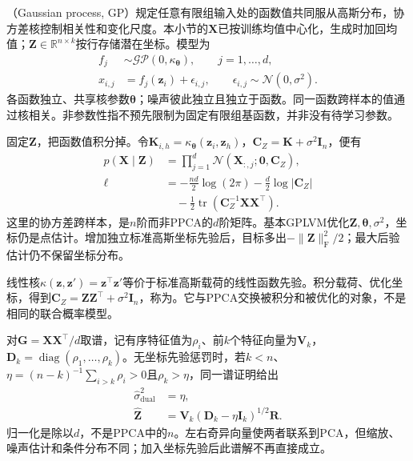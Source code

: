 （Gaussian process, GP）规定任意有限组输入处的函数值共同服从高斯分布，协方差核控制相关性和变化尺度。本小节的$\bm{X}$已按训练均值中心化，生成时加回均值；$\bm{Z}\in\mathbb{R}^{n\times k}$按行存储潜在坐标。模型为
\begin{equation}
\label{eq:dim-gplvm-generative}
\begin{aligned}
f_j&\sim\mathcal{GP}(0,\kappa_{\bm{\theta}}),
\qquad j=1,\ldots,d,\\
x_{i,j}&=f_j(\bm{z}_i)+\epsilon_{i,j},
\qquad \epsilon_{i,j}\sim\mathcal{N}(0,\sigma^2).
\end{aligned}
\end{equation}
各函数独立、共享核参数$\bm{\theta}$；噪声彼此独立且独立于函数。同一函数跨样本的值通过核相关。非参数性指不预先限制为固定有限组基函数，并非没有待学习参数。

固定$\bm{Z}$，把函数值积分掉。令$\bm{K}_{i,h}=\kappa_{\bm{\theta}}(\bm{z}_i,\bm{z}_h)$，$\bm{C}_Z=\bm{K}+\sigma^2\bm{I}_n$，便有
\begin{equation}
\label{eq:dim-gplvm-likelihood}
\begin{aligned}
p(\bm{X}\mid\bm{Z})
&=\prod_{j=1}^d
\mathcal{N}(\bm{X}_{:,j};\bm{0},\bm{C}_Z),\\
\ell&=-\frac{nd}{2}\log(2\pi)
-\frac{d}{2}\log|\bm{C}_Z|\\
&\quad-\frac{1}{2}
\operatorname{tr}(\bm{C}_Z^{-1}\bm{X}\bm{X}^\top).
\end{aligned}
\end{equation}
这里的协方差跨样本，是$n$阶而非PPCA的$d$阶矩阵。基本GPLVM优化$\bm{Z},\bm{\theta},\sigma^2$，坐标仍是点估计。增加独立标准高斯坐标先验后，目标多出$-\lVert\bm{Z}\rVert_{\mathrm{F}}^2/2$；最大后验估计仍不保留坐标分布。

线性核$\kappa(\bm{z},\bm{z}')=\bm{z}^\top\bm{z}'$等价于标准高斯载荷的线性函数先验。积分载荷、优化坐标，得到$\bm{C}_Z=\bm{Z}\bm{Z}^\top+\sigma^2\bm{I}_n$，称为。它与PPCA交换被积分和被优化的对象，不是相同的联合概率模型。

对$\bm{G}=\bm{X}\bm{X}^\top/d$取谱，记有序特征值为$\rho_i$、前$k$个特征向量为$\bm{V}_k$，$\bm{D}_k=\operatorname{diag}(\rho_1,\ldots,\rho_k)$。无坐标先验惩罚时，若$k<n$、$\eta=(n-k)^{-1}\sum_{i>k}\rho_i>0$且$\rho_k>\eta$，同一谱证明给出
\begin{equation}
\label{eq:dim-gplvm-dual}
\begin{aligned}
\hat{\sigma}_{\mathrm{dual}}^2&=\eta,\\
\hat{\bm{Z}}&=\bm{V}_k(\bm{D}_k-\eta\bm{I}_k)^{1/2}\bm{R}.
\end{aligned}
\end{equation}
归一化是除以$d$，不是PPCA中的$n$。左右奇异向量使两者联系到PCA，但缩放、噪声估计和条件分布不同；加入坐标先验后此谱解不再直接成立。

